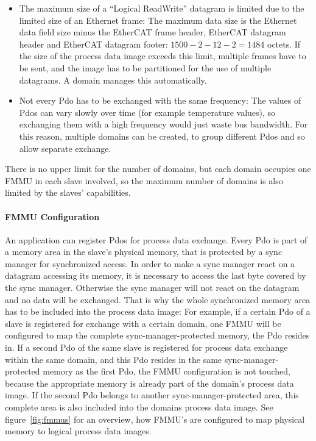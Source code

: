 \documentclass[a4paper,12pt,BCOR6mm,bibtotoc,idxtotoc]{scrbook}
\begin{document}
\begin{itemize}
\item The maximum size of a ``Logical ReadWrite'' datagram is limited
  due to the limited size of an Ethernet frame: The maximum data size
  is the Ethernet data field size minus the EtherCAT frame header,
  EtherCAT datagram header and EtherCAT datagram footer: $1500 - 2 -
  12 - 2 = 1484$ octets. If the size of the process data image exceeds
  this limit, multiple frames have to be sent, and the image has to be
  partitioned for the use of multiple datagrams. A domain manages this
  automatically.
\item Not every Pdo has to be exchanged with the same frequency: The
  values of Pdos can vary slowly over time (for example temperature
  values), so exchanging them with a high frequency would just waste
  bus bandwidth. For this reason, multiple domains can be created, to
  group different Pdos and so allow separate exchange.
\end{itemize}

There is no upper limit for the number of domains, but each domain
occupies one FMMU in each slave involved, so the maximum number of
domains is also limited by the slaves' capabilities.

\paragraph{FMMU Configuration}

An application can register Pdos for process data exchange. Every
Pdo is part of a memory area in the slave's physical memory, that is
protected by a sync manager \cite[section~6.7]{dlspec} for
synchronized access. In order to make a sync manager react on a
datagram accessing its memory, it is necessary to access the last byte
covered by the sync manager. Otherwise the sync manager will not react
on the datagram and no data will be exchanged. That is why the whole
synchronized memory area has to be included into the process data
image: For example, if a certain Pdo of a slave is registered for
exchange with a certain domain, one FMMU will be configured to map the
complete sync-manager-protected memory, the Pdo resides in. If a
second Pdo of the same slave is registered for process data exchange
within the same domain, and this Pdo resides in the same
sync-manager-protected memory as the first Pdo, the FMMU configuration
is not touched, because the appropriate memory is already part of the
domain's process data image.  If the second Pdo belongs to another
sync-manager-protected area, this complete area is also included into
the domains process data image. See figure~\ref{fig:fmmus} for an
overview, how FMMU's are configured to map physical memory to logical
process data images.
\end{document}
